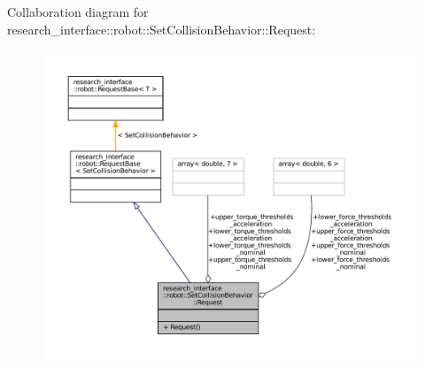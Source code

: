 Collaboration diagram for research\+\_\+interface\+:\+:robot\+:\+:Set\+Collision\+Behavior\+:\+:Request\+:
\nopagebreak
\begin{figure}[H]
\begin{center}
\leavevmode
\includegraphics[width=350pt]{structresearch__interface_1_1robot_1_1SetCollisionBehavior_1_1Request__coll__graph}
\end{center}
\end{figure}
